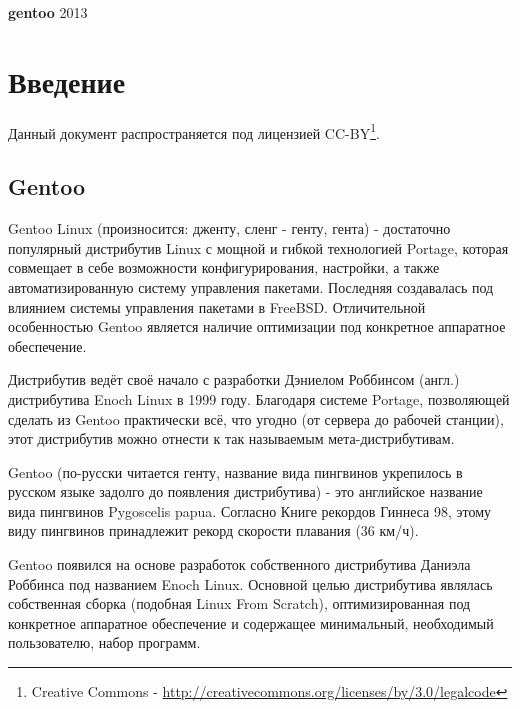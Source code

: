\documentclass[10pt, a4paper]{article}
\begin{document}
\begin{titlepage}
\begin{center}
\vspace*{10cm}
{ \rm \Huge \textbf
	{
		gentoo
	}
}
\vfill 
{ \rm \large  2013 }
\end{center}
\end{titlepage}

\tableofcontents

\newpage

\section{Введение}

Данный документ распространяется под лицензией CC-BY\footnote{Creative Commons - \href{http://creativecommons.org/licenses/by/3.0/legalcode}{http://creativecommons.org/licenses/by/3.0/legalcode}}.

\subsection{Gentoo}

Gentoo Linux (произносится: дженту, сленг - генту, гента) - достаточно популярный дистрибутив Linux с мощной и гибкой технологией Portage, которая совмещает в себе возможности конфигурирования, настройки, а также автоматизированную систему управления пакетами. Последняя создавалась под влиянием системы управления пакетами в FreeBSD. Отличительной особенностью Gentoo является наличие оптимизации под конкретное аппаратное обеспечение.

Дистрибутив ведёт своё начало с разработки Дэниелом Роббинсом (англ.) дистрибутива Enoch Linux в 1999 году. Благодаря системе Portage, позволяющей сделать из Gentoo практически всё, что угодно (от сервера до рабочей станции), этот дистрибутив можно отнести к так называемым мета-дистрибутивам.

Gentoo (по-русски читается генту, название вида пингвинов укрепилось в русском языке задолго до появления дистрибутива) - это английское название вида пингвинов Pygoscelis papua. Согласно Книге рекордов Гиннеса 98, этому виду пингвинов принадлежит рекорд скорости плавания (36 км/ч).

Gentoo появился на основе разработок собственного дистрибутива Даниэла Роббинса под названием Enoch Linux. Основной целью дистрибутива являлась собственная сборка (подобная Linux From Scratch), оптимизированная под конкретное аппаратное обеспечение и содержащее минимальный, необходимый пользователю, набор программ.
\end{document}
